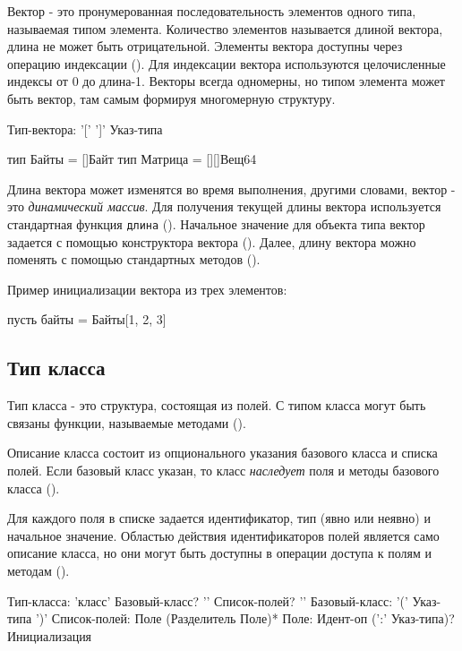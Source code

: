 Вектор - это пронумерованная последовательность элементов одного типа, называемая типом элемента. Количество элементов называется длиной вектора, длина не может быть отрицательной. Элементы вектора доступны через операцию индексации (). Для индексации вектора используются целочисленные индексы  от 0 до длина-1. Векторы всегда одномерны, но типом элемента может быть вектор, там самым формируя многомерную структуру.

\begin{Grammar}
Тип-вектора: '[' ']'  Указ-типа
\end{Grammar} 

\begin{Trivil}
тип Байты = []Байт
тип Матрица = [][]Вещ64
\end{Trivil}

Длина вектора может изменятся во время выполнения, другими словами, вектор - это \emph{динамический массив}. Для получения текущей длины вектора используется стандартная функция \verb|длина| ().
Начальное значение для объекта типа вектор задается с помощью конструктора вектора (). Далее, длину вектора можно поменять с помощью стандартных методов ().

Пример инициализации вектора из трех элементов:
\begin{Trivil}[vspace=2pt]
пусть байты = Байты[1, 2, 3]
\end{Trivil}

\hypertarget{class-types}{%
\subsection{Тип класса}\label{decls:class-types}}

Тип класса - это структура, состоящая из полей. С типом класса могут быть связаны функции, называемые методами ().

Описание класса состоит из опционального указания базового класса и списка полей. 
Если базовый класс указан, то класс \emph{наследует} поля и методы базового класса (). 

Для каждого поля в списке задается идентификатор, тип (явно или неявно) и начальное значение.
Областью действия идентификаторов полей является само описание класса, но они могут быть доступны в операции доступа к полям и методам ().

\begin{Grammar}
Тип-класса:  'класс' Базовый-класс? '{' Список-полей? '}'
Базовый-класс: '(' Указ-типа ')'
Список-полей: Поле (Разделитель Поле)*
Поле: Идент-оп (':' Указ-типа)? Инициализация
\end{Grammar} 

